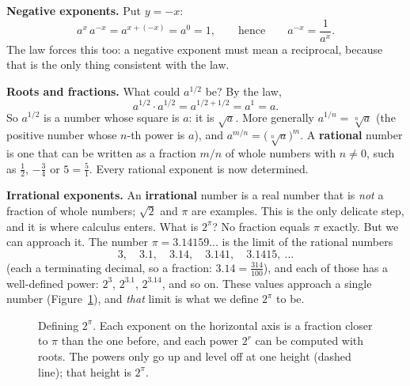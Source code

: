 \textbf{Negative exponents.} Put $y=-x$:
\[
a^x\, a^{-x} = a^{x+(-x)} = a^0 = 1,
\qquad\text{hence}\qquad
a^{-x} = \frac{1}{a^x}.
\]
The law forces this too: a negative exponent must mean a reciprocal, because that is the only thing consistent with the law.

\textbf{Roots and fractions.} What could $a^{1/2}$ be? By the law,
\[
a^{1/2}\cdot a^{1/2} = a^{1/2+1/2} = a^1 = a.
\]
So $a^{1/2}$ is a number whose square is $a$: it is $\sqrt{a}$. More generally $a^{1/n}=\sqrt[n]{a}$ (the positive number whose $n$-th power is $a$), and $a^{m/n}=\big(\sqrt[n]{a}\big)^m$. A \textbf{rational} number is one that can be written as a fraction $m/n$ of whole numbers with $n \ne 0$, such as $\tfrac12$, $-\tfrac34$ or $5=\tfrac51$. Every rational exponent is now determined.

\textbf{Irrational exponents.} An \textbf{irrational} number is a real number that is \emph{not} a fraction of whole numbers; $\sqrt2$ and $\pi$ are examples. This is the only delicate step, and it is where calculus enters. What is $2^{\pi}$? No fraction equals $\pi$ exactly. But we can approach it. The number $\pi = 3.14159\ldots$ is the limit of the rational numbers
\[
3,\quad 3.1,\quad 3.14,\quad 3.141,\quad 3.1415,\ \ldots
\]
(each a terminating decimal, so a fraction: $3.14=\tfrac{314}{100}$), and each of those has a well-defined power: $2^3$, $2^{3.1}$, $2^{3.14}$, and so on. These values approach a single number (Figure~\ref{ch03:fig-pi-approach}), and \emph{that} limit is what we define $2^{\pi}$ to be.

\begin{figure}[htbp]
\centering
{}
\caption{Defining $2^{\pi}$. Each exponent on the horizontal axis is a fraction closer to $\pi$ than the one before, and each power $2^r$ can be computed with roots. The powers only go up and level off at one height (dashed line); that height is $2^{\pi}$.}
\label{ch03:fig-pi-approach}
\end{figure}

